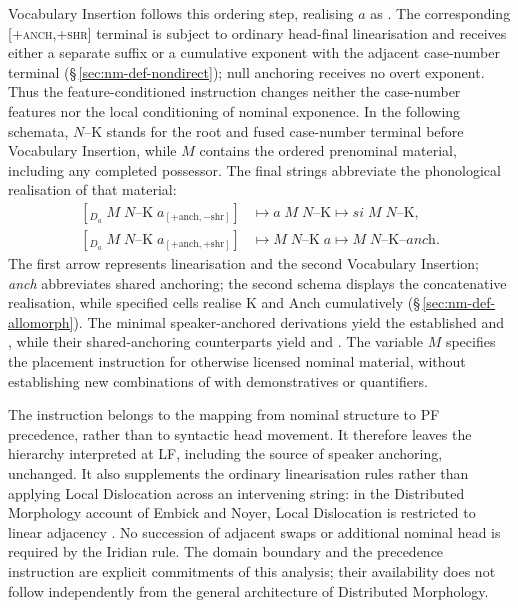 Vocabulary Insertion follows this ordering step, realising $a$ as .
The corresponding [\textsc{+anch,+shr}] terminal is subject to ordinary
head-final linearisation and receives either a separate suffix or a
cumulative exponent with the adjacent case-number terminal (§\,\ref{sec:nm-def-nondirect}); null anchoring receives
no overt exponent. Thus the feature-conditioned instruction changes neither
the case-number features nor the local conditioning of nominal exponence.
In the following schemata, $N$--K stands for the root and fused case-number
terminal before Vocabulary Insertion, while $M$ contains the ordered
prenominal material, including any completed possessor. The final strings
abbreviate the phonological realisation of that material:
\[
\begin{aligned}
  [_{D_a}\;M\;N\text{--K}\;a_{[+\mathrm{anch},-\mathrm{shr}]}]
    &\longmapsto a\;M\;N\text{--K}
      \longmapsto \textit{si}\;M\;N\text{--K},\\
  [_{D_a}\;M\;N\text{--K}\;a_{[+\mathrm{anch},+\mathrm{shr}]}]
    &\longmapsto M\;N\text{--K}\;a
      \longmapsto M\;N\text{--K--}\textit{anch}.
\end{aligned}
\]
The first arrow represents linearisation and the second Vocabulary Insertion;
\textit{anch} abbreviates shared anchoring; the second schema displays
the concatenative realisation, while specified cells realise K and Anch
cumulatively (§\,\ref{sec:nm-def-allomorph}). The minimal
speaker-anchored derivations yield the established  and
, while their shared-anchoring counterparts yield 
and . The variable $M$ specifies the placement instruction for
otherwise licensed nominal material, without establishing new combinations
of  with demonstratives or quantifiers.

The instruction belongs to the mapping from nominal structure to PF
precedence, rather than to syntactic head movement. It therefore leaves the
hierarchy interpreted at LF, including the source of speaker anchoring,
unchanged. It also supplements the ordinary linearisation rules rather than
applying Local Dislocation across an intervening string: in the Distributed
Morphology account of Embick and Noyer, Local Dislocation is restricted to
linear adjacency \cite{embicknoyer2007}. No succession of adjacent swaps or
additional nominal head is required by the Iridian rule. The domain boundary
and the precedence instruction are explicit commitments of this analysis;
their availability does not follow independently from the general
architecture of Distributed Morphology.

